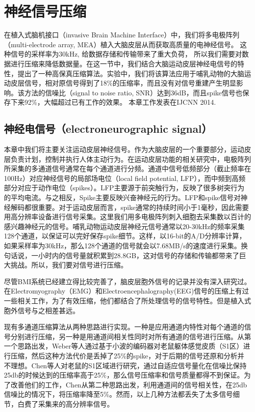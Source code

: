 \chapter{神经信号压缩}

在植入式脑机接口（invasive Brain Machine Interface）中，我们将多电极阵列（multi-electrode array, MEA）植入大脑皮层从而获取高质量的电神经信号。 这种信号的采样率为30kHz, 给数据存储和传输带来了重大负荷， 所以我们需要对数据进行压缩来降低数据量。在这一节中，我们结合大脑运动皮层神经电信号的特性，提出了一种高保真压缩算法。实验中，我们将该算法应用于哺乳动物的大脑运动皮层信号，相对原信号得到了18\%的压缩率，而且没有对信号重建产生明显影响。该方法的信噪比（signal to noise ratio, SNR）达到36dB，而且spike信号也保存下来92\%，大幅超过已有工作的效果。 本章工作发表在IJCNN 2014\cite{}.

\section{神经电信号（electroneurographic signal）}

本章中我们将主要关注运动皮层神经信号。作为大脑皮层的一个重要部分，运动皮层负责计划，控制并执行人体主动行为。在运动皮层功能的相关研究中，电极阵列所采集的多通道信号通常在每个通道进行分频。通道中信号低频部分（截止频率在100Hz）对应神经信号的局部场电位（local field potential, LFP），而中频到高频部分对应于动作电位（spikes）。LFP主要源于前突触行为，反映了很多树突行为的平均电流。与之相反，Spike主要反映兴奋神经元的行为。LFP和spike信号对神经解码都很重要。对于运动皮层而言，spike通常的持续时间小于1毫秒，因此需要用高分辨率设备进行信号采集。这里我们用多电极阵列刺入细胞去采集数以百计的感兴趣神经元的信号。哺乳动物运动皮层神经元信号通常以20-30kHz的频率采集128个通道，以保证可以完好保存spike细节。这样，以16-bit的A/D分辨率计算，如果采样率为30kHz，那么128个通道的信号就会以7.68MB/s的速度进行采集。换句话说，一小时内的信号量就积累到28.8GB，这对信号的存储和传输都带来了巨大挑战。所以，我们要对信号进行压缩。

尽管BMI系统已经建立得比较完善了，脑皮层胞外信号的记录并没有深入研究过。在Electromyography（EMG）和Electroencephalography(EEG)信号的压缩上有过一些相关工作\cite{}，为了有效压缩，他们都结合了所处理信号的信号特性。但是植入式胞外信号与之相差甚远。

现有多通道压缩算法从两种思路进行实现。一种是应用通道内特性对每个通道的信号分别进行压缩，另一种是用通道间相关性同时对所有通道的信号进行压缩。从第一个思路出发，Weber等人通过基于小波的编码器对老鼠躯体感觉皮质（S1区）进行压缩，然后这种方法代价是丢掉了25\%的spike，对于后期的信号还原和分析并不理想。Chen等人对老鼠的S1区域进行研究，通过自适应信号量化在信噪比保持25db的时候达到的压缩率高于25\%，那么信号压缩率和信号质量都得不到保证。为了改善他们的工作，Chen从第二种思路出发，利用通道间的信号相关性，在25db信噪比的情况下，将压缩率降至5\%。然而，以上几种方法都丢失了太多信号细节，白费了采集来的高分辨率信号。

